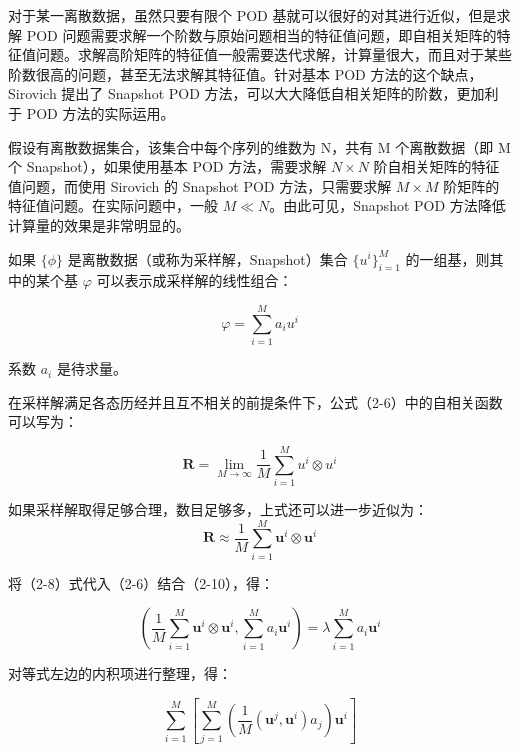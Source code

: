 对于某一离散数据，虽然只要有限个 POD 基就可以很好的对其进行近似，但是求解 POD 问题需要求解一个阶数与原始问题相当的特征值问题，即自相关矩阵的特征值问题。求解高阶矩阵的特征值一般需要迭代求解，计算量很大，而且对于某些阶数很高的问题，甚至无法求解其特征值。针对基本 POD 方法的这个缺点，Sirovich 提出了 Snapshot POD 方法，可以大大降低自相关矩阵的阶数，更加利于 POD 方法的实际运用。

假设有离散数据集合，该集合中每个序列的维数为 N，共有 M 个离散数据（即 M 个 Snapshot），如果使用基本 POD 方法，需要求解 \(N \times N\) 阶自相关矩阵的特征值问题，而使用 Sirovich 的 Snapshot POD 方法，只需要求解 \(M \times M\) 阶矩阵的特征值问题。在实际问题中，一般 \(M \ll N\)。由此可见，Snapshot POD 方法降低计算量的效果是非常明显的。

如果 \(\{\phi\}\) 是离散数据（或称为采样解，Snapshot）集合 \(\{u^i\}_{i=1}^M\) 的一组基，则其中的某个基 \(\varphi\) 可以表示成采样解的线性组合：

\begin{equation}
\varphi = \sum_{i=1}^M a_i u^i \tag{2-8}
\end{equation}

系数 \(a_i\) 是待求量。

在采样解满足各态历经并且互不相关的前提条件下，公式（2-6）中的自相关函数可以写为：

\begin{equation}
\mathbf{R} = \lim_{M \to \infty} \frac{1}{M} \sum_{i=1}^M u^i \otimes u^i \tag{2-9}
\end{equation}

如果采样解取得足够合理，数目足够多，上式还可以进一步近似为：
\begin{equation}
\mathbf{R} \approx \frac{1}{M} \sum_{i=1}^M \mathbf{u}^i \otimes \mathbf{u}^i \tag{2-10}
\end{equation}

将（2-8）式代入（2-6）结合（2-10），得：

\begin{equation}
\left( \frac{1}{M} \sum_{i=1}^M \mathbf{u}^i \otimes \mathbf{u}^i, \sum_{i=1}^M a_i \mathbf{u}^i \right) = \lambda \sum_{i=1}^M a_i \mathbf{u}^i \tag{2-11}
\end{equation}

对等式左边的内积项进行整理，得：

\begin{equation}
\sum_{i=1}^M \left[ \sum_{j=1}^M \left( \frac{1}{M} (\mathbf{u}^j, \mathbf{u}^i) a_j \right) \mathbf{u}^i \right] \tag{2-12}
\end{equation}

